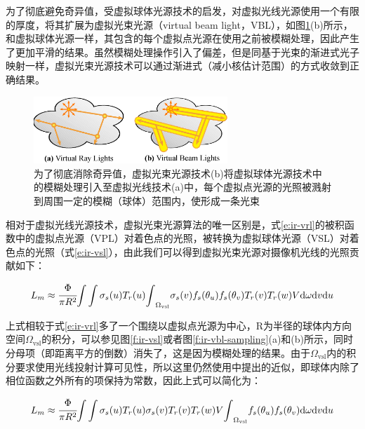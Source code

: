为了彻底避免奇异值，受虚拟球体光源技术的启发，\cite{a:ProgressiveVirtualBeamLights}对虚拟光线光源使用一个有限的厚度，将其扩展为虚拟光束光源（virtual beam light，VBL），如图\ref{f:ir-vrl-vs-vbl}(b)所示，和虚拟球体光源一样，其包含的每个虚拟点光源在使用之前被模糊处理，因此产生了更加平滑的结果。虽然模糊处理操作引入了偏差，但是同基于光束的渐进式光子映射一样，虚拟光束光源技术可以通过渐进式（减小核估计范围）的方式收敛到正确结果。

\begin{figure}
	\sidecaption
	\includegraphics[width=0.65\textwidth]{figures/ir/vrl-vs-vbl}
	\caption{为了彻底消除奇异值，虚拟光束光源技术(b)将虚拟球体光源技术中的模糊处理引入至虚拟光线技术(a)中，每个虚拟点光源的光照被溅射到周围一定的模糊（球体）范围内，使形成一条光束}
	\label{f:ir-vrl-vs-vbl}
\end{figure}

相对于虚拟光线光源技术，虚拟光束光源算法的唯一区别是，式\ref{e:ir-vrl}的被积函数中的虚拟点光源（VPL）对着色点的光照，被转换为虚拟球体光源（VSL）对着色点的光照（式\ref{e:ir-vsl}），由此我们可以得到虚拟光束光源对摄像机光线的光照贡献如下：

\begin{equation}
	L_m\approx \cfrac{\Phi}{\pi R^{2}}{\rm \int}\int \sigma_s(u)T_r(u){\rm \int}_{\Omega_{\text{vsl}}}\sigma_s(v)f_s(\theta_u)f_s(\theta_v)T_r(v)T_r(w)V {\rm d}\omega {\rm d}v{\rm d}u
\end{equation}

\noindent 上式相较于式\ref{e:ir-vrl}多了一个围绕以虚拟点光源为中心，R为半径的球体内方向空间$\Omega_{\text{vsl}}$的积分，可以参见图\ref{f:ir-vsl}或者图\ref{f:ir-vbl-sampling}(a)和(b)所示，同时分母项（即距离平方的倒数）消失了，这是因为模糊处理的结果。由于$\Omega_{\text{vsl}}$内的积分要求使用光线投射计算可见性，所以这里仍然使用\cite{a:VirtualSphericalLightsforMany-LightRenderingofGlossyScenes}中提出的近似，即球体内除了相位函数之外所有的项保持为常数，因此上式可以简化为：

\begin{equation}\label{e:ir-vbl}
	L_m\approx \cfrac{\Phi}{\pi R^{2}}{\rm \int}\int \sigma_s(u)T_r(u)\sigma_s(v)T_r(v)T_r(w)V{\rm \int}_{\Omega_{\text{vsl}}}f_s(\theta_u)f_s(\theta_v) {\rm d}\omega {\rm d}v{\rm d}u
\end{equation}

